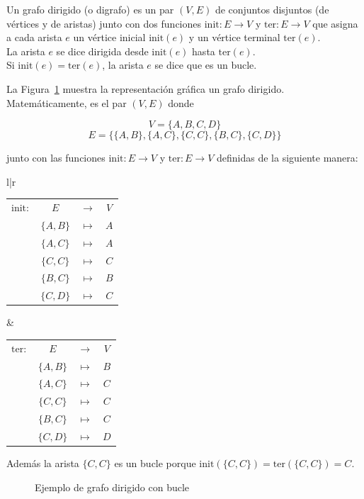 \begin{defi}
	Un grafo dirigido (o digrafo) es un par $(V,E)$ de conjuntos disjuntos (de vértices y de aristas) junto con dos funciones $\mathrm{init} : E \to V$ y $\mathrm{ter} : E \to V$ que asigna a cada arista $e$ un vértice inicial $\mathrm{init}(e)$ y un vértice terminal $\mathrm{ter}(e)$.\\
	
	La arista $e$ se dice dirigida desde $\mathrm{init}(e)$ hasta $\mathrm{ter}(e)$.\\
	
	Si $\mathrm{init}(e) = \mathrm{ter}(e)$, la arista $e$ se dice que es un bucle.
\end{defi}

\begin{ejemplo}
	La Figura~\ref{fig:grafo_dirigido} muestra la representación gráfica un grafo dirigido. Matemáticamente, es el par $(V,E)$ donde
	
	\[V  = \{A, B, C, D\}\]
	\[E = \{ \{A,B\}, \{A,C\}, \{C,C\},\{B,C\}, \{C,D\} \} \]
	
	junto con las funciones $\mathrm{init} : E \to V $ y $\mathrm{ter} : E \to V$ definidas de la siguiente manera:
	
	\begin{center}
		\begin{tabular}{l|r}
			\begin{tabular}{r c c c}
				$\mathrm{init}:$ & $E$ & $\to$ & $V$\\
				& $\{A,B\}$ & $\mapsto$ & $A$\\
				& $\{A,C\}$ & $\mapsto$ & $A$\\
				& $\{C,C\}$ & $\mapsto$ & $C$\\
				& $\{B,C\}$ & $\mapsto$ & $B$\\
				& $\{C,D\}$ & $\mapsto$ & $C$\\
				
			\end{tabular} &
			\begin{tabular}{r c c c}
				$\mathrm{ter}:$ & $E$ & $\to$ & $V$\\
				& $\{A,B\}$ & $\mapsto$ & $B$\\
				& $\{A,C\}$ & $\mapsto$ & $C$\\
				& $\{C,C\}$ & $\mapsto$ & $C$\\
				& $\{B,C\}$ & $\mapsto$ & $C$\\
				& $\{C,D\}$ & $\mapsto$ & $D$\\
				
			\end{tabular} 
		\end{tabular}
	\end{center}
	
	Además la arista $\{C,C\}$ es un bucle porque $\mathrm{init}(\{C,C\}) = \mathrm{ter}(\{C,C\}) = C$.
	
	\begin{figure}[h]
		\centering
		\ejemplografodirigido
		\caption{Ejemplo de grafo dirigido con bucle}
		\label{fig:grafo_dirigido}
	\end{figure}
	
\end{ejemplo}


